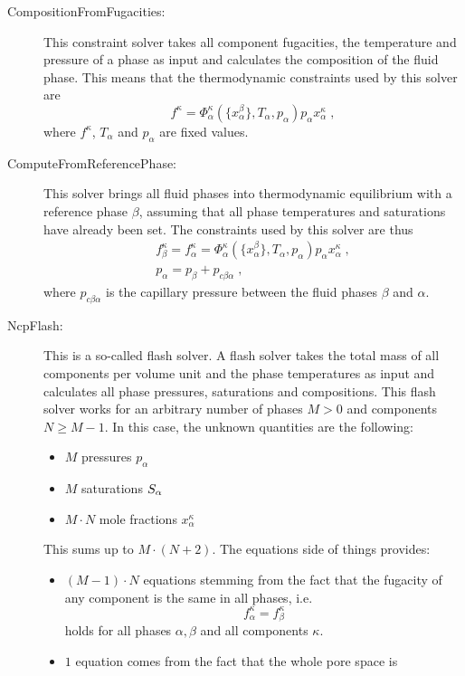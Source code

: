 \begin{description}
\item[CompositionFromFugacities:] This constraint solver takes all
  component fugacities, the temperature and pressure of a phase as
  input and calculates the composition of the fluid phase. This means
  that the thermodynamic constraints used by this solver are
  \[
  f^\kappa = \Phi^\kappa_\alpha(\{x^\beta_\alpha \}, T_\alpha, p_\alpha)  p_\alpha x^\kappa_\alpha\;,
  \]
  where ${f^\kappa}$, $T_\alpha$ and $p_\alpha$ are fixed values.
\item[ComputeFromReferencePhase:] This solver brings all
  fluid phases into thermodynamic equilibrium with a reference phase
  $\beta$, assuming that all phase temperatures and saturations have
  already been set. The constraints used by this solver are thus
  \begin{eqnarray*}
  f^\kappa_\beta = f^\kappa_\alpha = \Phi^\kappa_\alpha(\{x^\beta_\alpha \}, T_\alpha, p_\alpha)  p_\alpha x^\kappa_\alpha\;, \\
  p_\alpha = p_\beta + p_{c\beta\alpha} \;,
  \end{eqnarray*}
  where $p_{c\beta\alpha}$ is the capillary pressure between the
  fluid phases $\beta$ and $\alpha$.
\item[NcpFlash:] This is a so-called flash solver. A flash solver
  takes the total mass of all components per volume unit and the phase
  temperatures as input and calculates all phase pressures,
  saturations and compositions. This flash solver works for an
  arbitrary number of phases $M > 0$ and components $N \geq M - 1$. In
  this case, the unknown quantities are the following:
  \begin{itemize}
  \item $M$ pressures $p_\alpha$
  \item $M$ saturations $S_\alpha$
  \item $M\cdot N$ mole fractions $x^\kappa_\alpha$
  \end{itemize}
  This sums up to $M\cdot(N + 2)$. The equations side of things
  provides:
  \begin{itemize}
  \item $(M - 1)\cdot N$ equations stemming from the fact that the
    fugacity of any component is the same in all phases, i.e.
    \[
    f^\kappa_\alpha = f^\kappa_\beta
    \]
    holds for all phases $\alpha, \beta$ and all components $\kappa$.
  \item $1$ equation comes from the fact that the whole pore space is

\end{itemize}
\end{description}
